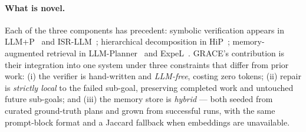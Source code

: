 \paragraph{What is novel.}
Each of the three components has precedent: symbolic verification
appears in LLM+P~\cite{liu2023llmp} and ISR-LLM~\cite{zhou2024isrllm};
hierarchical decomposition in HiP~\cite{ajay2023hip}; memory-augmented
retrieval in LLM-Planner~\cite{song2023llmplanner} and
ExpeL~\cite{zhao2024expel}. GRACE's contribution is their integration
into one system under three constraints that differ from prior work:
(i) the verifier is hand-written and \emph{LLM-free}, costing zero
tokens; (ii) repair is \emph{strictly local} to the failed sub-goal,
preserving completed work and untouched future sub-goals; and
(iii) the memory store is \emph{hybrid} — both seeded from curated
ground-truth plans and grown from successful runs, with the same
prompt-block format and a Jaccard fallback when embeddings are
unavailable.

